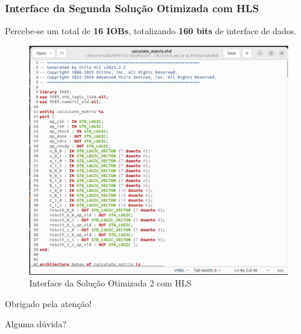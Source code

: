 \documentclass{beamer}
\begin{document}
    \begin{frame}
        \frametitle{Interface da Segunda Solução Otimizada com HLS}

        \begingroup {}
        Percebe-se um total de \textbf{16 IOBs}, totalizando
        \textbf{160 bits} de interface de dados.
        \endgroup

        \begin{figure}[h] 
            \centering
            \includegraphics[width=0.55\linewidth]{./images/solutions/VHDL_-_Unroll_and_Array_Partitioning.png}
            \caption{\label{img:int-hls-optimized-solution-2} Interface da Solução Otimizada 2 com HLS}
          \end{figure}
    \end{frame}

    \begin{frame}
        \centering \huge
        \vfill
        Obrigado pela atenção!

        Alguma dúvida?
        \vfill
    \end{frame}
\end{document}
